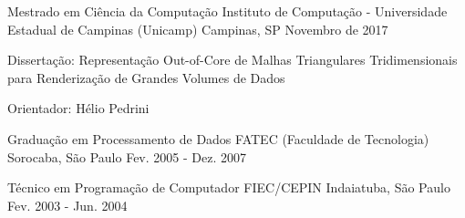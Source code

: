 \begin{cventries}
  \cventry
    {Mestrado em Ciência da Computação}
    {Instituto de Computação - Universidade Estadual de Campinas (Unicamp)}
    {Campinas, SP}
    {Novembro de 2017}
    {
      \begin{cvitems}
      \item Dissertação: Representação Out-of-Core de Malhas Triangulares Tridimensionais para Renderização de Grandes Volumes de Dados
      \item{Orientador: Hélio Pedrini}
  \end{cvitems}
}
  \cventry
    {Graduação em Processamento de Dados}
    {FATEC (Faculdade de Tecnologia)}
    {Sorocaba, São Paulo}
    {Fev. 2005 - Dez. 2007}
    {}

  \cventry
  	{Técnico em Programação de Computador}
    {FIEC/CEPIN}
    {Indaiatuba, São Paulo}
    {Fev. 2003 - Jun. 2004}
    {}
\end{cventries}

